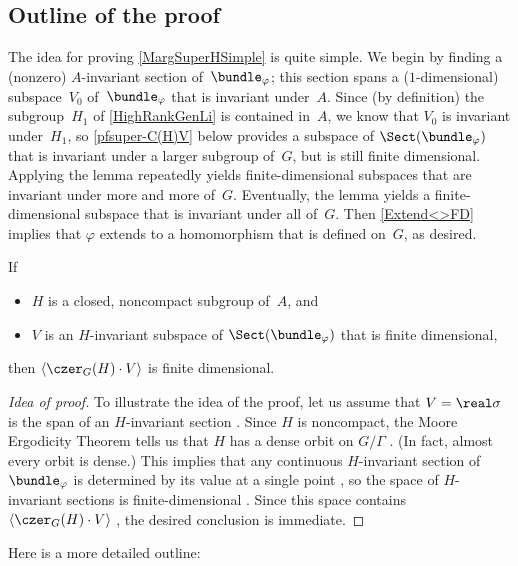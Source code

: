 \subsection{Outline of the proof}

The idea for proving \cref{MargSuperHSimple} is quite simple. We begin by finding a (nonzero) $A$-invariant section of~$\bundle_\varphi$; this section spans a ($1$-dimensional) subspace~$V_0$ of~$\bundle_\varphi$ that is invariant under~$A$. Since (by definition) the subgroup~$H_1$ of \cref{HighRankGenLi} is contained in~$A$, we know that $V_0$ is invariant under~$H_1$, so \cref{pfsuper-C(H)V} below provides a subspace of $\Sect(\bundle_\varphi)$ that is invariant under a larger subgroup of~$G$, but is still finite dimensional. Applying the lemma repeatedly yields finite-dimensional subspaces that are invariant under more and more of~$G$. Eventually, the lemma yields a finite-dimensional subspace that is invariant under all of~$G$. Then \cref{Extend<>FD} implies that $\varphi$ extends to a homomorphism that is defined on~$G$, as desired.

\begin{lem} \label{pfsuper-C(H)V}
If
\noprelistbreak
	\begin{itemize}
	\item $H$ is a closed, noncompact subgroup of~$A$,
	and
	\item $V$ is an $H$-invariant subspace of\/ $\Sect(\bundle_\varphi)$ that is finite dimensional,
	\end{itemize}
then $\langle \czer_G(H) \cdot V \rangle$ is finite dimensional.
\end{lem}

\begin{proof}[Idea of proof]
To illustrate the idea of the proof, let us assume that $V = \real \sigma$ is the span of an $H$-invariant section .
Since $H$ is noncompact, the Moore Ergodicity Theorem  tells us that $H$ has a dense orbit on $G/\Gamma$ . (In fact, almost every orbit is dense.) This implies that any continuous $H$-invariant section of~$\bundle_\varphi$ is determined by its value at a single point , so the space of $H$-invariant sections is finite-dimensional . Since this space contains $\langle \czer_G(H) \cdot V \rangle$ , the desired conclusion is immediate.
\end{proof}

Here is a more detailed outline:

